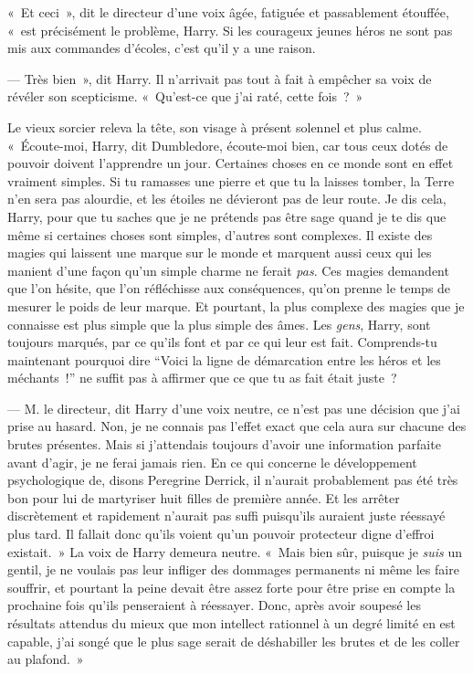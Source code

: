 «~Et ceci~», dit le directeur d'une voix âgée, fatiguée et passablement étouffée, «~est précisément le problème, Harry. Si les courageux jeunes héros ne sont pas mis aux commandes d'écoles, c'est qu'il y a une raison.

--- Très bien~», dit Harry. Il n'arrivait pas tout à fait à empêcher sa voix de révéler son scepticisme. «~Qu'est-ce que j'ai raté, cette fois~?~»

Le vieux sorcier releva la tête, son visage à présent solennel et plus calme. «~Écoute-moi, Harry, dit Dumbledore, écoute-moi bien, car tous ceux dotés de pouvoir doivent l'apprendre un jour. Certaines choses en ce monde sont en effet vraiment simples. Si tu ramasses une pierre et que tu la laisses tomber, la Terre n'en sera pas alourdie, et les étoiles ne dévieront pas de leur route. Je dis cela, Harry, pour que tu saches que je ne prétends pas être sage quand je te dis que même si certaines choses sont simples, d'autres sont complexes. Il existe des magies qui laissent une marque sur le monde et marquent aussi ceux qui les manient d'une façon qu'un simple charme ne ferait \emph{pas}. Ces magies demandent que l'on hésite, que l'on réfléchisse aux conséquences, qu'on prenne le temps de mesurer le poids de leur marque. Et pourtant, la plus complexe des magies que je connaisse est plus simple que la plus simple des âmes. Les \emph{gens}, Harry, sont toujours marqués, par ce qu'ils font et par ce qui leur est fait. Comprends-tu maintenant pourquoi dire “Voici la ligne de démarcation entre les héros et les méchants~!” ne suffit pas à affirmer que ce que tu as fait était juste~?

--- M. le directeur, dit Harry d'une voix neutre, ce n'est pas une décision que j'ai prise au hasard. Non, je ne connais pas l'effet exact que cela aura sur chacune des brutes présentes. Mais si j'attendais toujours d'avoir une information parfaite avant d'agir, je ne ferai jamais rien. En ce qui concerne le développement psychologique de, disons Peregrine Derrick, il n'aurait probablement pas été très bon pour lui de martyriser huit filles de première année. Et les arrêter discrètement et rapidement n'aurait pas suffi puisqu'ils auraient juste réessayé plus tard. Il fallait donc qu'ils voient qu'un pouvoir protecteur digne d'effroi existait.~» La voix de Harry demeura neutre. «~Mais bien sûr, puisque je \emph{suis} un gentil, je ne voulais pas leur infliger des dommages permanents ni même les faire souffrir, et pourtant la peine devait être assez forte pour être prise en compte la prochaine fois qu'ils penseraient à réessayer. Donc, après avoir soupesé les résultats attendus du mieux que mon intellect rationnel à un degré limité en est capable, j'ai songé que le plus sage serait de déshabiller les brutes et de les coller au plafond.~»

